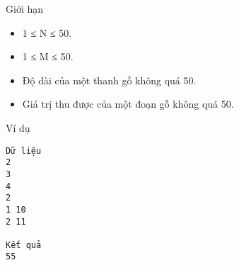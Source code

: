 Giới hạn  
\begin{itemize}
	\item     1 ≤ N ≤ 50.   
	\item     1 ≤ M ≤ 50.   
	\item     Độ dài của một thanh gỗ không quá 50.   
	\item     Giá trị thu được của một đoạn gỗ không quá 50.   
\end{itemize}
   Ví dụ  
\begin{verbatim}
Dữ liệu
2
3
4
2
1 10
2 11

Kết quả
55
\end{verbatim}